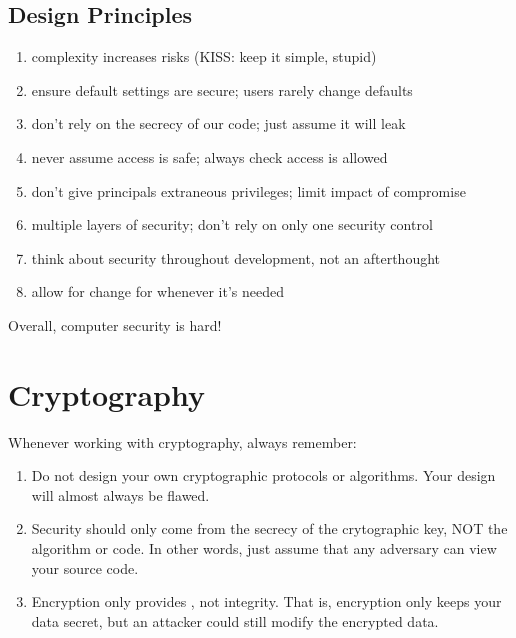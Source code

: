 \documentclass[code]{amznotes}
\begin{document}
\section{Design Principles}
\begin{enumerate}
    \item {} complexity increases risks (KISS: keep it simple, stupid)
    \item {} ensure default settings are secure; users rarely change defaults
    \item {} don't rely on the secrecy of our code; just assume it will leak
    \item {} never assume access is safe; always check access is allowed
    \item {} don't give principals extraneous privileges; limit impact of compromise
    \item {} multiple layers of security; don't rely on only one security control
    \item {} think about security throughout development, not an afterthought
    \item {} allow for change for whenever it's needed
\end{enumerate}

Overall, computer security is hard! 



\chapter{Cryptography}
Whenever working with cryptography, always remember:
\begin{enumerate}[noitemsep]
    \item Do not design your own cryptographic protocols or algorithms. Your design will almost always be flawed.
    \item {} Security should only come from the secrecy of the crytographic key, NOT the algorithm or code. In other words, just assume that any adversary can view your source code.
    \item Encryption only provides , not integrity. That is, encryption only keeps your data secret, but an attacker could still modify the encrypted data.
\end{enumerate}
\end{document}
